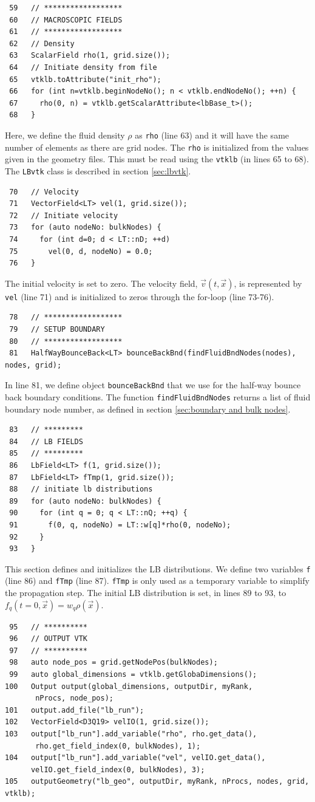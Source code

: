 \documentclass[11pt,a4paper]{report}
\begin{document}
\begin{verbatim}
 59   // ******************
 60   // MACROSCOPIC FIELDS
 61   // ******************
 62   // Density
 63   ScalarField rho(1, grid.size());
 64   // Initiate density from file
 65   vtklb.toAttribute("init_rho");
 66   for (int n=vtklb.beginNodeNo(); n < vtklb.endNodeNo(); ++n) {
 67     rho(0, n) = vtklb.getScalarAttribute<lbBase_t>();
 68   }
\end{verbatim}
Here, we define the fluid density $\rho$ as \texttt{rho} (line 63) and it will have the same number of elements as there are grid nodes. The \texttt{rho} is initialized from the values given in the geometry files. This must be read using the \texttt{vtklb} (in lines 65 to 68). The \texttt{LBvtk} class is described in section \ref{sec:lbvtk}.
\begin{verbatim}
 70   // Velocity
 71   VectorField<LT> vel(1, grid.size());
 72   // Initiate velocity
 73   for (auto nodeNo: bulkNodes) {
 74     for (int d=0; d < LT::nD; ++d)
 75       vel(0, d, nodeNo) = 0.0;
 76   }
\end{verbatim}
The initial velocity is set to zero. The velocity field, $\vec{v}(t, \vec{x})$, is represented by \texttt{vel} (line 71) and is initialized to zeros through the for-loop (line 73-76). 
\begin{verbatim}
 78   // ******************
 79   // SETUP BOUNDARY
 80   // ******************
 81   HalfWayBounceBack<LT> bounceBackBnd(findFluidBndNodes(nodes), nodes, grid);
\end{verbatim}
In line 81, we define object \texttt{bounceBackBnd} that we use for the half-way bounce back boundary conditions. The function \texttt{findFluidBndNodes} returns a list of fluid boundary node number, as defined in section \ref{sec:boundary and bulk nodes}.
\begin{verbatim}
 83   // *********
 84   // LB FIELDS
 85   // *********
 86   LbField<LT> f(1, grid.size()); 
 87   LbField<LT> fTmp(1, grid.size());
 88   // initiate lb distributions
 89   for (auto nodeNo: bulkNodes) {
 90     for (int q = 0; q < LT::nQ; ++q) {
 91       f(0, q, nodeNo) = LT::w[q]*rho(0, nodeNo);
 92     }
 93   }
\end{verbatim}
This section defines and initializes the LB distributions. We define two variables \texttt{f} (line 86) and \texttt{fTmp} (line 87). \texttt{fTmp} is only used as a temporary variable to simplify the propagation step. The initial LB distribution is set, in lines 89 to 93, to $f_q(t=0, \vec{x}) = w_q\rho(\vec{x})$.  
\begin{verbatim}
 95   // **********
 96   // OUTPUT VTK
 97   // **********
 98   auto node_pos = grid.getNodePos(bulkNodes); 
 99   auto global_dimensions = vtklb.getGlobaDimensions();
100   Output output(global_dimensions, outputDir, myRank, 
       nProcs, node_pos);
101   output.add_file("lb_run");
102   VectorField<D3Q19> velIO(1, grid.size());
103   output["lb_run"].add_variable("rho", rho.get_data(), 
       rho.get_field_index(0, bulkNodes), 1);
104   output["lb_run"].add_variable("vel", velIO.get_data(), 
      velIO.get_field_index(0, bulkNodes), 3);
105   outputGeometry("lb_geo", outputDir, myRank, nProcs, nodes, grid, vtklb);
\end{verbatim}
\end{document}
